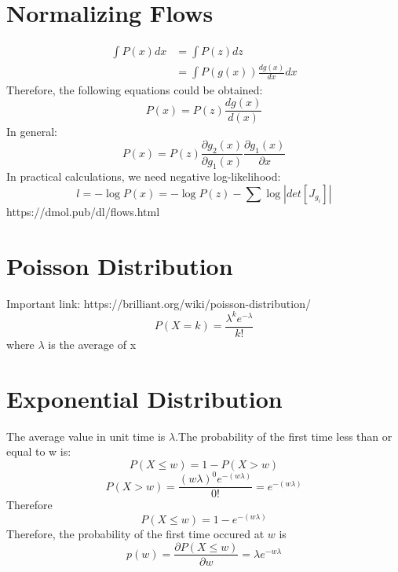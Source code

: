 \documentclass{article}
\begin{document}
\section{Normalizing Flows}
\begin{equation}
\begin{split}
\int P(x)dx &=\int P(z)dz \\
            &=\int P(g(x))\frac{dg(x)}{dx}dx
\end{split}
\end{equation}
Therefore, the following equations could be obtained:
\begin{equation}
P(x)=P(z)\frac{dg(x)}{d(x)}
\end{equation}
In general:
\begin{equation}
P(x)=P(z)\frac{\partial g_{2}(x)}{\partial g_{1}(x)}\frac{\partial g_{1}(x)}{\partial x}
\end{equation}
In practical calculations, we need negative log-likelihood:
\begin{equation}
l = -\log P(x)=-\log P(z)-\sum \log |det[J_{g_{i}}]|
\end{equation}
https://dmol.pub/dl/flows.html

\section{Poisson Distribution}
Important link: https://brilliant.org/wiki/poisson-distribution/
\begin{equation}
P(X=k)=\frac{\lambda ^{k}e^{-\lambda}}{k!}
\end{equation}
where $\lambda$ is the average of x

\section{Exponential Distribution}
The average value in unit time is $\lambda$.The probability of the first time less than or equal to w is:
\begin{equation}
P(X\leq w)=1-P(X>w)
\end{equation}
\begin{equation}
P(X>w)=\frac{(w\lambda)^{0}e^{-(w\lambda)}}{0!}=e^{-(w\lambda)}
\end{equation}
Therefore
\begin{equation}
P(X\leq w)=1-e^{-(w\lambda)}
\end{equation}
Therefore, the probability of the first time occured at $w$ is 
\begin{equation}
p(w)=\frac{\partial P(X\leq w)}{\partial w}=\lambda e^{-w\lambda}
\end{equation}
\end{document}
